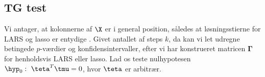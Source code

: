 
\subsection{TG test}
Vi antager, at kolonnerne af \(\X\) er i general position, således at løsningsstierne for LARS og lasso er entydige \citep{lasso_unique}. 
Givet antallet af steps \(k\), da kan vi let udregne betingede \(p\)-værdier og konfidensintervaller, efter vi har konstrueret matricen \(\boldsymbol{\Gamma}\) for henholdsvis LARS eller lasso.
Lad os teste nulhypotesen \(\hyp_0: \ \teta^T \tmu = 0\), hvor \(\teta\) er arbitrær.

